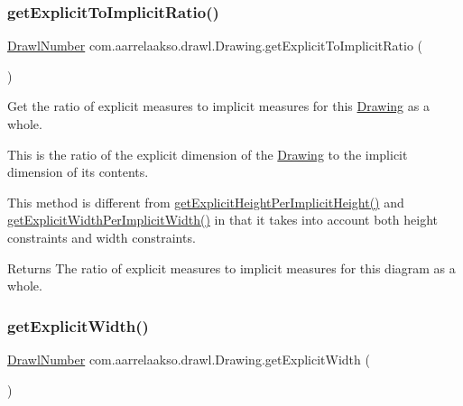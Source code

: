 \subsubsection{\texorpdfstring{get\+Explicit\+To\+Implicit\+Ratio()}{getExplicitToImplicitRatio()}}
{\footnotesize\ttfamily \hyperlink{classcom_1_1aarrelaakso_1_1drawl_1_1_drawl_number}{Drawl\+Number} com.\+aarrelaakso.\+drawl.\+Drawing.\+get\+Explicit\+To\+Implicit\+Ratio (\begin{DoxyParamCaption}{ }\end{DoxyParamCaption})}



Get the ratio of explicit measures to implicit measures for this \hyperlink{classcom_1_1aarrelaakso_1_1drawl_1_1_drawing}{Drawing} as a whole. 

This is the ratio of the explicit dimension of the \hyperlink{classcom_1_1aarrelaakso_1_1drawl_1_1_drawing}{Drawing} to the implicit dimension of its contents. 

This method is different from \hyperlink{classcom_1_1aarrelaakso_1_1drawl_1_1_drawing_ab4be923426dabfdaffecb5b3ff22b95b}{get\+Explicit\+Height\+Per\+Implicit\+Height()} and \hyperlink{classcom_1_1aarrelaakso_1_1drawl_1_1_drawing_ab578293cefe01c28b1e4d8ea28f85e05}{get\+Explicit\+Width\+Per\+Implicit\+Width()} in that it takes into account both height constraints and width constraints.

\begin{DoxyReturn}{Returns}
The ratio of explicit measures to implicit measures for this diagram as a whole. 
\end{DoxyReturn}
\mbox{\label{classcom_1_1aarrelaakso_1_1drawl_1_1_drawing_aa3154a900c39b56463f485f7b8b3bb5a}} 
\subsubsection{\texorpdfstring{get\+Explicit\+Width()}{getExplicitWidth()}}
{\footnotesize\ttfamily \hyperlink{classcom_1_1aarrelaakso_1_1drawl_1_1_drawl_number}{Drawl\+Number} com.\+aarrelaakso.\+drawl.\+Drawing.\+get\+Explicit\+Width (\begin{DoxyParamCaption}{ }\end{DoxyParamCaption})}



